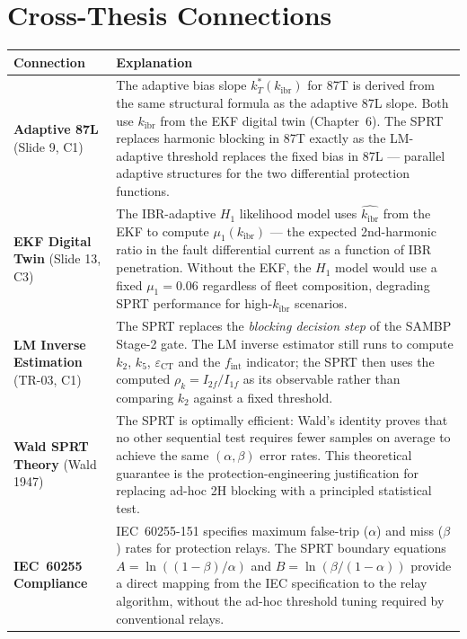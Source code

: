\documentclass[12pt,a4paper]{article}
\newcommand{\kibr}{k_\mathrm{ibr}}
\begin{document}
\section{Cross-Thesis Connections}

\begin{center}
\begin{tabular}{@{}p{4cm}p{10.5cm}@{}}
\toprule
\textbf{Connection} & \textbf{Explanation} \\
\midrule
\textbf{Adaptive 87L} \newline (Slide 9, C1) &
The adaptive bias slope $k_T^*(\kibr)$ for 87T is derived from the same structural formula as the adaptive 87L slope. Both use $\kibr$ from the EKF digital twin (Chapter~6). The SPRT replaces harmonic blocking in 87T exactly as the LM-adaptive threshold replaces the fixed bias in 87L --- parallel adaptive structures for the two differential protection functions. \\
\addlinespace
\textbf{EKF Digital Twin} \newline (Slide 13, C3) &
The IBR-adaptive $H_1$ likelihood model uses $\hat{\kibr}$ from the EKF to compute $\mu_1(\kibr)$ — the expected 2nd-harmonic ratio in the fault differential current as a function of IBR penetration. Without the EKF, the $H_1$ model would use a fixed $\mu_1 = 0.06$ regardless of fleet composition, degrading SPRT performance for high-$\kibr$ scenarios. \\
\addlinespace
\textbf{LM Inverse Estimation} \newline (TR-03, C1) &
The SPRT replaces the \textit{blocking decision step} of the SAMBP Stage-2 gate. The LM inverse estimator still runs to compute $k_2$, $k_5$, $\varepsilon_\mathrm{CT}$ and the $f_\mathrm{int}$ indicator; the SPRT then uses the computed $\rho_k = I_{2f}/I_{1f}$ as its observable rather than comparing $k_2$ against a fixed threshold. \\
\addlinespace
\textbf{Wald SPRT Theory} \newline (Wald 1947) &
The SPRT is optimally efficient: Wald's identity proves that no other sequential test requires fewer samples on average to achieve the same $(\alpha, \beta)$ error rates. This theoretical guarantee is the protection-engineering justification for replacing ad-hoc 2H blocking with a principled statistical test. \\
\addlinespace
\textbf{IEC~60255 Compliance} &
IEC~60255-151 specifies maximum false-trip ($\alpha$) and miss ($\beta$) rates for protection relays. The SPRT boundary equations $A = \ln((1-\beta)/\alpha)$ and $B = \ln(\beta/(1-\alpha))$ provide a direct mapping from the IEC specification to the relay algorithm, without the ad-hoc threshold tuning required by conventional relays. \\
\bottomrule
\end{tabular}
\end{center}
\end{document}
